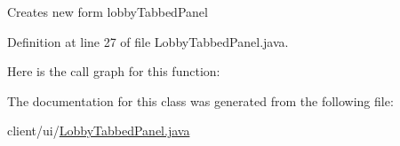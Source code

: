 Creates new form lobby\+Tabbed\+Panel 

Definition at line 27 of file Lobby\+Tabbed\+Panel.\+java.

Here is the call graph for this function\+:


The documentation for this class was generated from the following file\+:\begin{DoxyCompactItemize}
\item 
client/ui/\hyperlink{_lobby_tabbed_panel_8java}{Lobby\+Tabbed\+Panel.\+java}\end{DoxyCompactItemize}
